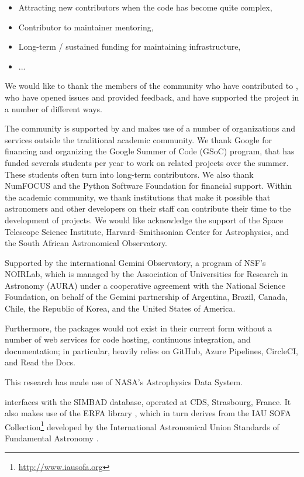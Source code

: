 \documentclass[modern]{aastex631}
\begin{document}
\begin{itemize}
\item Attracting new contributors when the code has become quite complex,
\item Contributor to maintainer mentoring,
\item Long-term / sustained funding for maintaining infrastructure,
\item ...
\end{itemize}


\begin{acknowledgments}

We would like to thank the members of the community who have contributed to
\astropy, who have opened issues and provided feedback, and have supported the
project in a number of different ways.

The \astropy community is supported by and makes use of a number of
organizations and services outside the traditional academic community.
We thank Google for financing and organizing the
Google Summer of Code (GSoC) program, that has funded severals
students per year to work on \astropy related projects over the
summer. These students often turn into long-term contributors.
We also thank NumFOCUS and the Python Software Foundation for financial
support.
Within the academic community, we thank institutions that make it possible that
astronomers and other developers on their staff can contribute their time to the
development of \astropy projects.
We would like acknowledge the support of the Space Telescope Science Institute,
Harvard--Smithsonian Center for Astrophysics, and the South African Astronomical
Observatory.

Supported by the international Gemini Observatory, a program of NSF's NOIRLab,
which is managed by the Association of Universities for Research in Astronomy
(AURA) under a cooperative agreement with the National Science Foundation, on
behalf of the Gemini partnership of Argentina, Brazil, Canada, Chile, the
Republic of Korea, and the United States of America.

Furthermore, the \astropy packages would not exist in their current form without
a number of web services for code hosting, continuous integration, and
documentation; in particular, \astropy heavily relies on GitHub, Azure
Pipelines, CircleCI, and Read the Docs.

This research has made use of NASA's Astrophysics Data System.

\astropypkg interfaces with the SIMBAD database, operated at CDS, Strasbourg,
France. It also makes use of the ERFA library \citep{erfa}, which in turn
derives from the IAU SOFA Collection\footnote{\url{http://www.iausofa.org}}
developed by the International Astronomical Union Standards of Fundamental
Astronomy \citep{sofa}.

\end{acknowledgments}
\end{document}
